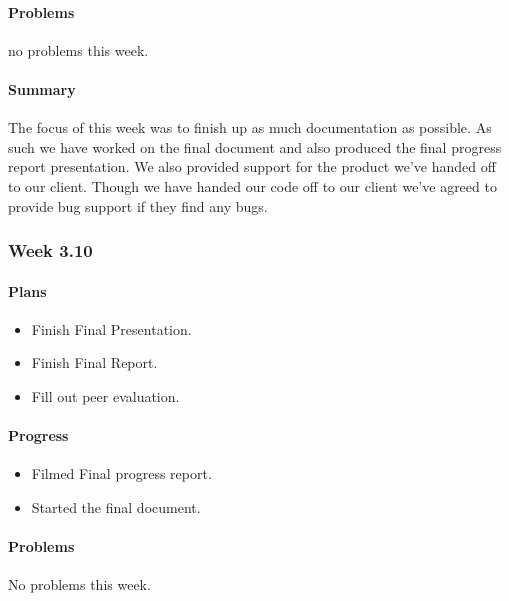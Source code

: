 \documentclass[onecolumn, draftclsnofoot,10pt, compsoc]{article}
\begin{document}
		    \paragraph{Problems} \hfill \break
		            no problems this week.\\
		    \paragraph{Summary} \hfill \break
            The focus of this week was to finish up as much documentation as possible. As such we have worked on the final document and also produced the final progress report presentation. We also provided support for the product we've handed off to our client. Though we have handed our code off to our client we've agreed to provide bug support if they find any bugs.\\
		\subsubsection{Week 3.10}
		    \paragraph{Plans} \hfill \break
		        \begin{itemize}
		            \item Finish Final Presentation.\\
		            \item Finish Final Report.\\
		            \item Fill out peer evaluation.\\
		        \end{itemize}
		    \paragraph{Progress} \hfill \break
		        \begin{itemize}
		            \item Filmed Final progress report.\\
		            \item Started the final document.\\
		        \end{itemize}
		    \paragraph{Problems} \hfill \break
                No problems this week.\\
\end{document}
